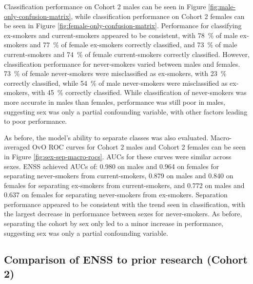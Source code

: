 \documentclass{article} %
\begin{document}
Classification performance on Cohort 2 males can be seen in Figure \ref{fig:male-only-confusion-matrix}, while classification performance on Cohort 2 females can be seen in Figure \ref{fig:female-only-confusion-matrix}. Performance for classifying ex-smokers and current-smokers appeared to be consistent, with \SI{78}{\percent} of male ex-smokers and \SI{77}{\percent} of female ex-smokers correctly classified, and \SI{73}{\percent} of male current-smokers and \SI{74}{\percent} of female current-smokers correctly classified. However, classification performance for never-smokers varied between males and females. \SI{73}{\percent} of female never-smokers were misclassified as ex-smokers, with \SI{23}{\percent} correctly classified, while \SI{54}{\percent} of male never-smokers were misclassified as ex-smokers, with \SI{45}{\percent} correctly classified. While classification of never-smokers was more accurate in males than females, performance was still poor in males, suggesting sex was only a partial confounding variable, with other factors leading to poor performance.

As before, the model's ability to separate classes was also evaluated. Macro-averaged OvO ROC curves for Cohort 2 males and Cohort 2 females can be seen in Figure \ref{fig:sex-sep-macro-rocs}. AUCs for these curves were similar across sexes.
ENSS achieved AUCs of: 0.980 on males and 0.964 on females for separating never-smokers from current-smokers, 0.879 on males and 0.840 on females for separating ex-smokers from current-smokers, and 0.772 on males and 0.637 on females for separating never-smokers from ex-smokers. Separation performance appeared to be consistent with the trend seen in classification, with the largest decrease in performance between sexes for never-smokers. As before, separating the cohort by sex only led to a minor increase in performance, suggesting sex was only a partial confounding variable.

\newpage
\subsection{Comparison of ENSS to prior research (Cohort 2)} \label{sec:model-comparisons}

\end{document}
